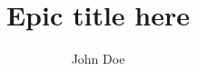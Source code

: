 \documentclass[masters,11pt,blue]{csuthesis}
\title{Epic title here}
\author{John Doe}
\begin{document}
\frontmatter
    \begin{abstract}
        
    \end{abstract}
    \begin{acknowledgments}     %
        
    \end{acknowledgments}
    \begin{dedication}          %
        
    \end{dedication}
\maketitle
\tableofcontents
\listoffigures   %
\listoftables    %
\mainmatter
    
\backmatter
    {\clearpage}
    
    {
    }
    {\clearpage}
    \appendix
    
\end{document}
